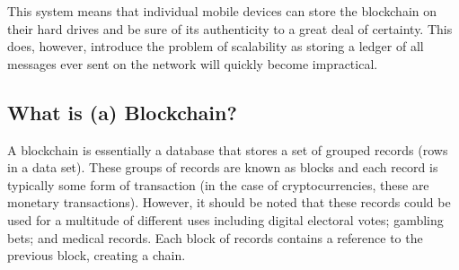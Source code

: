 \documentclass{article}
\begin{document}
This system means that individual mobile devices can store the blockchain on their hard drives and be sure of its authenticity to a great deal of certainty. This does, however, introduce the problem of scalability as storing a ledger of all messages ever sent on the network will quickly become impractical.

\subsection{What is (a) Blockchain?}\label{subsubsec:whatisablockchain}
A blockchain is essentially a database that stores a set of grouped records (rows in a data set). These groups of records are known as blocks and each record is typically some form of transaction (in the case of cryptocurrencies, these are monetary transactions). However, it should be noted that these records could be used for a multitude of different uses including digital electoral votes; gambling bets; and medical records. Each block of records contains a reference to the previous block, creating a chain.
\end{document}
